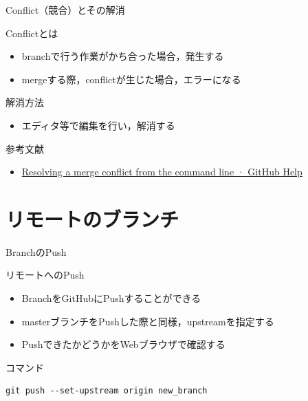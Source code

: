 \documentclass[t, aspectratio=169]{beamer}
\begin{document}
\begin{frame}[label=sec-3-2-4]{Conflict（競合）とその解消}
\begin{block}{Conflictとは}
\begin{itemize}
\item branchで行う作業がかち合った場合，発生する
\item mergeする際，conflictが生じた場合，エラーになる
\end{itemize}
\end{block}
\begin{block}{解消方法}
\begin{itemize}
\item エディタ等で編集を行い，解消する
\end{itemize}
\end{block}
\begin{block}{参考文献}
\begin{itemize}
\item \href{https://help.github.com/articles/resolving-a-merge-conflict-from-the-command-line}{Resolving a merge conflict from the command line · GitHub Help}
\end{itemize}
\end{block}
\end{frame}
\section{リモートのブランチ}
\label{sec-3-3}
\begin{frame}[fragile,label=sec-3-3-1]{BranchのPush}
 \begin{block}{リモートへのPush}
\begin{itemize}
\item BranchをGitHubにPushすることができる
\item masterブランチをPushした際と同様，upstreamを指定する
\item PushできたかどうかをWebブラウザで確認する
\end{itemize}
\end{block}

\begin{block}{コマンド}
\begin{verbatim}
git push --set-upstream origin new_branch
\end{verbatim}
\end{block}
\end{frame}
\end{document}
